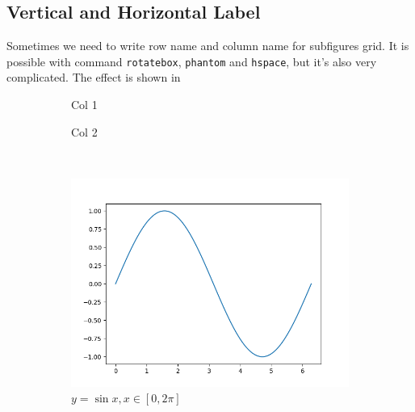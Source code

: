 \subsection{Vertical and Horizontal Label}
Sometimes we need to write row name and column name for subfigures grid. It is possible with command \verb|rotatebox|, \verb|phantom| and \verb|hspace|, but it's also very complicated. The effect is shown in
\begin{figure}
    \centering
    \hspace{0.02\linewidth}
    \begin{subfigure}{0.3\linewidth}
        \caption*{Col 1}
    \end{subfigure}
    \hspace{0.02\linewidth}
    \begin{subfigure}{0.3\linewidth}
        \caption*{Col 2}
    \end{subfigure}
    \\
    \hspace{0.02\linewidth}
    \begin{subfigure}{0.3\linewidth}
        \includegraphics[width=\linewidth]{../figures/sin.png}
        \caption{\(y=\sin x, x\in[0,2\pi]\)}
    \end{subfigure}
    \hspace{0.02\linewidth}
    \begin{subfigure}{0.3\linewidth}

\end{subfigure}
\end{figure}
